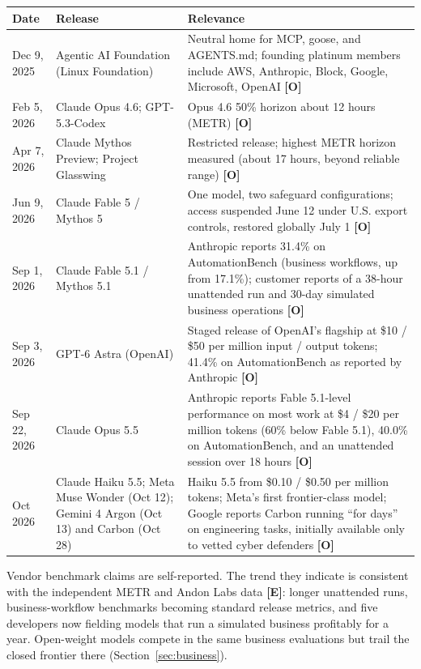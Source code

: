 \documentclass[11pt,letterpaper]{article}
\begin{document}
{\small
\setlength{\LTleft}{0pt}\setlength{\LTright}{0pt}
\begin{longtable}{L{2.3cm}L{4.0cm}L{9.6cm}}
\toprule
\textbf{Date} & \textbf{Release} & \textbf{Relevance} \\
\midrule
\endhead
Dec 9, 2025 & Agentic AI Foundation (Linux Foundation) & Neutral home for MCP, goose, and AGENTS.md; founding platinum members include AWS, Anthropic, Block, Google, Microsoft, OpenAI \textbf{[O]} \\
Feb 5, 2026 & Claude Opus 4.6; GPT-5.3-Codex & Opus 4.6 50\% horizon about 12 hours (METR) \textbf{[O]} \\
Apr 7, 2026 & Claude Mythos Preview; Project Glasswing & Restricted release; highest METR horizon measured (about 17 hours, beyond reliable range) \textbf{[O]} \\
Jun 9, 2026 & Claude Fable 5 / Mythos 5 & One model, two safeguard configurations; access suspended June 12 under U.S. export controls, restored globally July 1 \textbf{[O]} \\
Sep 1, 2026 & Claude Fable 5.1 / Mythos 5.1 & Anthropic reports 31.4\% on AutomationBench (business workflows, up from 17.1\%); customer reports of a 38-hour unattended run and 30-day simulated business operations \textbf{[O]} \\
Sep 3, 2026 & GPT-6 Astra (OpenAI) & Staged release of OpenAI's flagship at \$10 / \$50 per million input / output tokens; 41.4\% on AutomationBench as reported by Anthropic \textbf{[O]} \\
Sep 22, 2026 & Claude Opus 5.5 & Anthropic reports Fable 5.1-level performance on most work at \$4 / \$20 per million tokens (60\% below Fable 5.1), 40.0\% on AutomationBench, and an unattended session over 18 hours \textbf{[O]} \\
Oct 2026 & Claude Haiku 5.5; Meta Muse Wonder (Oct 12); Gemini 4 Argon (Oct 13) and Carbon (Oct 28) & Haiku 5.5 from \$0.10 / \$0.50 per million tokens; Meta's first frontier-class model; Google reports Carbon running ``for days'' on engineering tasks, initially available only to vetted cyber defenders \textbf{[O]} \\
\bottomrule
\end{longtable}
}

Vendor benchmark claims are self-reported. The trend they indicate is consistent with the independent METR and Andon Labs data \textbf{[E]}: longer unattended runs, business-workflow benchmarks becoming standard release metrics, and five developers now fielding models that run a simulated business profitably for a year. Open-weight models compete in the same business evaluations but trail the closed frontier there (Section~\ref{sec:business}).
\end{document}
